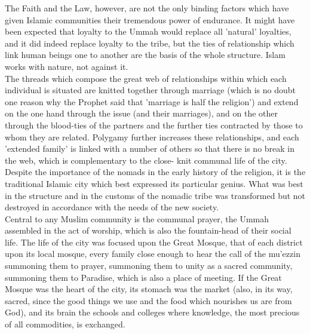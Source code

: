 \documentclass[11pt, b5paper, twoside]{book}
\begin{document}
The Faith and the Law, however, are not the only binding factors which have given Islamic communities 
their tremendous power of endurance. It might have been expected that loyalty to the Ummah would 
replace all 'natural' loyalties, and it did indeed replace loyalty to the tribe, but the ties of 
relationship which link human beings one to another are the basis of the whole structure. Islam works 
with nature, not against it. \\

The threads which compose the great web of relationships within which each individual is situated are 
knitted together through marriage (which is no doubt one reason why the Prophet said that 'marriage 
is half the religion') and extend on the one hand through the issue (and their marriages), and on the 
other through the blood-ties of the partners and the further ties contracted by those to whom they 
are related. Polygamy further increases these relationships, and each 'extended family' is linked 
with a number of others so that there is no break in the web, which is complementary to the close-
knit communal life of the city. \\

Despite the importance of the nomads in the early history of the religion, it is the traditional 
Islamic city which best expressed its particular genius. What was best in the structure and in the 
customs of the nomadic tribe was transformed but not destroyed in accordance with the needs of the 
new society. \\

Central to any Muslim community is the communal prayer, the Ummah assembled in the act of worship, 
which is also the fountain-head of their social life. The life of the city was focused upon the Great 
Mosque, that of each district upon its local mosque, every family close enough to hear the call of 
the mu'ezzin summoning them to prayer, summoning them to unity as a sacred community, summoning them 
to Paradise, which is also a place of meeting. If the Great Mosque was the heart of the city, its 
stomach was the market (also, in its way, sacred, since the good things we use and the food which 
nourishes us are from God), and its brain the schools and colleges where knowledge, the most precious 
of all commodities, is exchanged. \\
\end{document}
